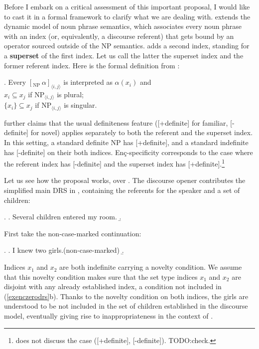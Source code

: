 \documentclass[11pt,a4paper]{article}
\newcommand{\encspec}{Enç-specific}
\begin{document}

Before I embark on a critical assessment of this important proposal, I
would like to cast it in a formal framework to clarify what we are
dealing with.  extends the dynamic model of noun phrase
semantics, which associates every noun phrase with an index (or,
equivalently, a discourse referent) that gets bound by an operator
sourced outside of the NP semantics.   adds a second
index, standing for a \textbf{superset} of the first index. Let us
call the latter the superset index and the former referent index.
Here is the formal definition from :

\ex.\label{encform} Every $[_{\text{NP}}\  \alpha ]_{\langle i,j\rangle}$ is interpreted as
$\alpha(x_i)$ and\\
$x_i \subseteq x_j$ if $\text{NP}_{\langle i,j\rangle}$ is plural;\\
$\{x_i\} \subseteq x_j$ if $\text{NP}_{\langle i,j\rangle}$ is
singular.

 further claims that the usual definiteness feature ([+definite]
for familiar, [-definite] for novel) applies separately to both the referent
and the superset index. In this setting, a standard definite NP has
[+definite], and a standard indefinite has [-definite] on their both indices.
\encspec ity corresponds to the case where the referent index has [-definite]
and the superset index has [+definite].\footnote{ does not discuss
the case ([+definite], [-definite]). TODO:check.}

Let us see how the proposal works, over . The discourse opener
 contributes the simplified main DRS in ,
containing the referents for the speaker and a set of children:

\ex.\label{exencmaindrs}
\a. Several children entered my room.
\b. 

First take the non-case-marked continuation:

\ex.\label{exenczerodrs}
\a. I knew two girls.\hfill (non-case-marked)
\b.

Indices $x_1$ and $x_2$ are both indefinite carrying a novelty condition. We
assume that this novelty condition makes sure that the set type indices $x_1$
and $x_2$ are disjoint with any already established index, a condition not
included in (\ref{exenczerodrs}b).  Thanks to the novelty condition on both
indices, the girls are understood to be not included in the set of children
established in the discourse model, eventually giving rise to inappropriateness
in the context of .
\end{document}
